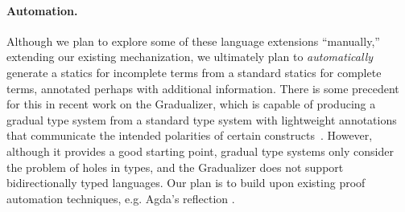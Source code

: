 \paragraph{Automation.} Although we plan to
    explore some of these language extensions 
    ``manually,'' extending our existing mechanization, we ultimately plan 
    to \emph{automatically}
    generate a statics for incomplete terms from a standard statics for complete terms,
    annotated perhaps with additional information. There is some precedent for
    this in recent work on the Gradualizer, which is capable of
    producing a gradual type system from a standard type system with lightweight
    annotations that communicate the intended polarities of certain
    constructs~\cite{DBLP:conf/popl/CiminiS16}. However, although it provides a good starting point, gradual type systems 
    only consider the problem of holes in 
    types, and the Gradualizer does not support bidirectionally typed languages.
    Our plan is to build 
    upon existing proof automation techniques, e.g. Agda's reflection \cite{van2012engineering}.

